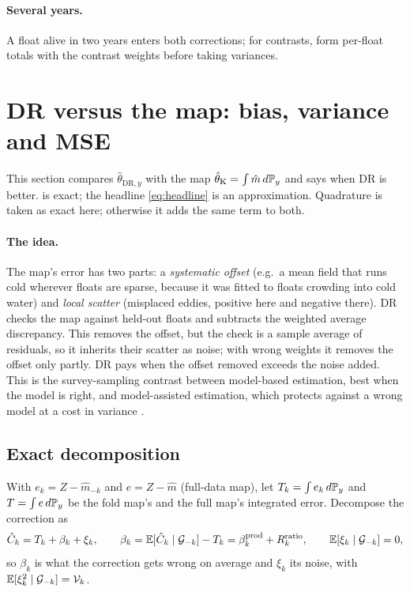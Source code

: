 \paragraph{Several years.} A float alive in two years enters both corrections; for contrasts, form
per-float totals with the contrast weights before taking variances.

\section{DR versus the map: bias, variance and MSE}\label{sec:gain}

This section compares $\hat\theta_{\mathrm{DR},y}$ with the map $\hat\theta_{\mathrm K}=\int\hat m\,d\mathbb{P}_y$
and says when DR is better.  is exact; the headline \eqref{eq:headline} is an
approximation. Quadrature is taken as exact here; otherwise it adds the same term to both.

\paragraph{The idea.} The map's error has two parts: a \emph{systematic offset} (e.g.\ a mean field
that runs cold wherever floats are sparse, because it was fitted to floats crowding into cold water)
and \emph{local scatter} (misplaced eddies, positive here and negative there). DR checks the map against
held-out floats and subtracts the weighted average discrepancy. This removes the offset, but the check
is a sample average of residuals, so it inherits their scatter as noise; with wrong weights it removes
the offset only partly. DR pays when the offset removed exceeds the noise added. This is the
survey-sampling contrast between model-based estimation, best when the model is right, and
model-assisted estimation, which protects against a wrong model at a cost in variance
\citep{hansen1983,sarndal1992}.

\subsection{Exact decomposition}

With $e_k=Z-\hat m_{-k}$ and $e=Z-\hat m$ (full-data map), let $T_k=\int e_k\,d\mathbb{P}_y$ and
$T=\int e\,d\mathbb{P}_y$ be the fold map's and the full map's integrated error. Decompose the correction as
\[
  \hat C_k=T_k+\beta_k+\xi_k,\qquad \beta_k=\mathbb{E}[\hat C_k\mid\mathcal G_{-k}]-T_k=\beta^{\mathrm{prod}}_k+R^{\mathrm{ratio}}_k,
  \qquad\mathbb{E}[\xi_k\mid\mathcal G_{-k}]=0 ,
\]
so $\beta_k$ is what the correction gets wrong on average and $\xi_k$ its noise, with
$\mathbb{E}[\xi_k^2\mid\mathcal G_{-k}]=\mathcal V_k$.

